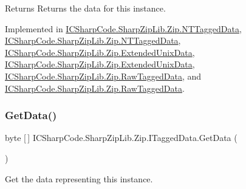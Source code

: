 \begin{DoxyReturn}{Returns}
Returns the data for this instance.
\end{DoxyReturn}


Implemented in \hyperlink{class_i_c_sharp_code_1_1_sharp_zip_lib_1_1_zip_1_1_n_t_tagged_data_adde7c262e6270ca2419f1d4a26a9701a}{I\+C\+Sharp\+Code.\+Sharp\+Zip\+Lib.\+Zip.\+N\+T\+Tagged\+Data}, \hyperlink{class_i_c_sharp_code_1_1_sharp_zip_lib_1_1_zip_1_1_n_t_tagged_data_adde7c262e6270ca2419f1d4a26a9701a}{I\+C\+Sharp\+Code.\+Sharp\+Zip\+Lib.\+Zip.\+N\+T\+Tagged\+Data}, \hyperlink{class_i_c_sharp_code_1_1_sharp_zip_lib_1_1_zip_1_1_extended_unix_data_affc68b6149e70affca3d7bcd41d9634b}{I\+C\+Sharp\+Code.\+Sharp\+Zip\+Lib.\+Zip.\+Extended\+Unix\+Data}, \hyperlink{class_i_c_sharp_code_1_1_sharp_zip_lib_1_1_zip_1_1_extended_unix_data_affc68b6149e70affca3d7bcd41d9634b}{I\+C\+Sharp\+Code.\+Sharp\+Zip\+Lib.\+Zip.\+Extended\+Unix\+Data}, \hyperlink{class_i_c_sharp_code_1_1_sharp_zip_lib_1_1_zip_1_1_raw_tagged_data_acd58d127e920dae4d94b2e396a6fc91c}{I\+C\+Sharp\+Code.\+Sharp\+Zip\+Lib.\+Zip.\+Raw\+Tagged\+Data}, and \hyperlink{class_i_c_sharp_code_1_1_sharp_zip_lib_1_1_zip_1_1_raw_tagged_data_acd58d127e920dae4d94b2e396a6fc91c}{I\+C\+Sharp\+Code.\+Sharp\+Zip\+Lib.\+Zip.\+Raw\+Tagged\+Data}.

\mbox{\label{interface_i_c_sharp_code_1_1_sharp_zip_lib_1_1_zip_1_1_i_tagged_data_a1534d99dec9f2bc6652875e66fba50e6}} 
\subsubsection{\texorpdfstring{Get\+Data()}{GetData()}\hspace{0.1cm}{\footnotesize\ttfamily [2/2]}}
{\footnotesize\ttfamily byte \mbox{[}$\,$\mbox{]} I\+C\+Sharp\+Code.\+Sharp\+Zip\+Lib.\+Zip.\+I\+Tagged\+Data.\+Get\+Data (\begin{DoxyParamCaption}{ }\end{DoxyParamCaption})}



Get the data representing this instance. 

